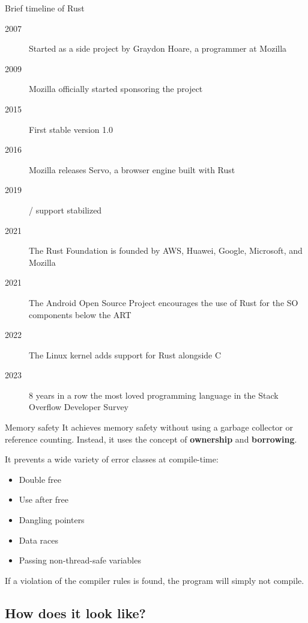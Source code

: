 \documentclass{beamer}
\begin{document}
\begin{frame}{Brief timeline of Rust}
  \begin{description}
    \item [2007] Started as a side project by Graydon Hoare, a programmer at Mozilla
    \item [2009] Mozilla officially started sponsoring the project
    \item [2015] First stable version 1.0
    \item [2016] Mozilla releases Servo, a browser engine built with Rust
    \item [2019] / support stabilized
    \item [2021] The Rust Foundation is founded by AWS, Huawei, Google, Microsoft, and Mozilla
    \item [2021] The Android Open Source Project encourages the use of Rust for the SO components below the ART
    \item [2022] The Linux kernel adds support for Rust alongside C
    \item [2023] 8 years in a row the most loved programming language in the Stack Overflow Developer Survey
  \end{description}
\end{frame}

\begin{frame}{Memory safety}
  It achieves memory safety without using a garbage collector or reference counting.
  Instead, it uses the concept of \textbf{ownership} and \textbf{borrowing}.

  \vfill
  \pause

  It prevents a wide variety of error classes at compile-time:

  \begin{itemize}
    \item Double free
    \item Use after free
    \item Dangling pointers
    \item Data races
    \item Passing non-thread-safe variables
  \end{itemize}

  \vfill

  If a violation of the compiler rules is found, the program will simply not compile.
\end{frame}

\subsection{How does it look like?}
\end{document}
